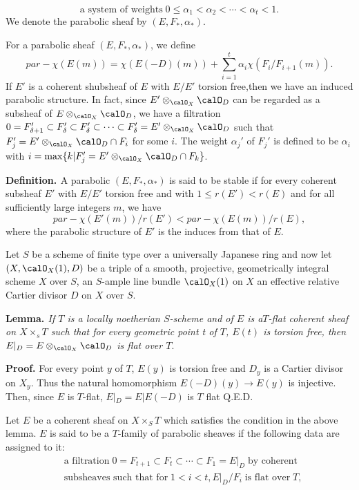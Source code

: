 \begin{equation}
\text{a system of weights} \; 0 \leq \alpha_{1} < \alpha_{2} < \cdots < \alpha_{t} < 1.\tag{2.1.2}\label{art12-eq-2.1.2}
\end{equation}
We denote the parabolic sheaf by $(E, F_{*}, \alpha_{*})$.

For a parabolic sheaf $(E, F_{*}, \alpha_{*})$, we define
$$
par-\chi(E(m))= \chi(E(-D)(m)) + \sum\limits_{i=1}^{t} \alpha_{i}\chi(F_{i}/F_{i+1}(m)).
$$ 
If $E'$ is a coherent shubsheaf of $E$ with $E/E'$ torsion free,then we have an induced parabolic structure. In fact, since $E'\otimes_{\calO_{X}}\calO_{D}$ can be regarded as a subsheaf of $E\otimes_{\calO_{X}}\calO_{D}$, we have a filtration $0 =F_{\delta+1}' \subset F_{\delta}' \subset F_{\delta}' \subset \cdots\subset F_{\delta}'=E' \otimes_{\calO_{X}}\calO_{D}$ such that $F_{j}' = E'\otimes_{\calO_{X}} \calO_{D} \cap F_{i}$ for some $i$. The weight $\alpha_{j}'$ of $F_{j}'$ is defined to be $\alpha_{i}$ with $i=\max\{k | F_{j}' =E'\otimes_{\calO_{X}}\calO_{D} \cap F_{k}\}$.

\medskip
\noindent
{\bfseries {} Definition. \label{art12-definition-2.2}} A parabolic $(E, F_{*}, \alpha_{*})$ is said to be stable if for every coherent subsheaf $E'$ with $E/E'$ torsion free and with $1 \leq r(E')< r(E)$ and for all sufficiently large integers $m$, we have
$$
par-\chi(E'(m))/r(E') < par-\chi(E(m))/r(E),
$$
where the parabolic structure of $E'$ is the induces from that of $E$.

Let $S$ be a scheme of finite type over a universally Japanese ring and now let $(X, \calO_{X}(1),D)$ be a triple of a smooth, projective, geometrically integral scheme $X$ over $S$, an $S$-ample line bundle $\calO_{X}(1)$ on $X$ an effective relative Cartier divisor $D$ on $X$ over $S$.

\medskip
\noindent
{\bfseries {} Lemma. \label{art12-Lemma-2.3}} \textit{If $T$ is a locally noetherian $S$-scheme and of $E$ is a$T$-flat coherent sheaf on $X \times_{s}T$ such that for every geometric point t of $T$, $E(t)$ is torsion free, then $E|_{D}=E\otimes_{\calO_{X}}\calO_{D}$ is flat over $T$}.

\medskip
\noindent
{\bfseries Proof.} For every point $y$ of $T$, $E(y)$ is torsion free and $D_{y}$ is a Cartier divisor on $X_{y}$. Thus the natural homomorphism $E(-D)(y)\rightarrow E(y)$ is injective. Then, since $E$ is $T$-flat, $E|_{D}=E|E(-D)$ is $T$ flat \hfill Q.E.D.

Let $E$ be a coherent sheaf on $X \times_{S}T$ which satisfies the condition in the above lemma. $E$ is said to be a $T$-family of parabolic sheaves if the following data are assigned to it:
\begin{align}\label{art12-eq-2.4.1}
 &\text{a filtration}\; 0=F_{t+1}\subset F_{t} \subset \cdots \subset F_{1}= E|_{D}\; \text{by coherent}\tag{2.4.1}\\
  &      \text{subsheaves such that for}\; 1 <i < t, E|_{D}/F_{i}\; \text{is flat over}\; T\nonumber, 
\end{align}

